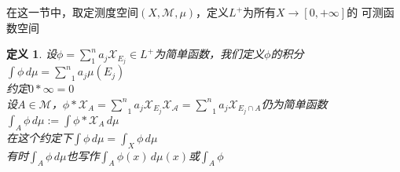 \documentclass[12pt, a4paper, oneside]{ctexbook}
\newtheorem{definition}[theorem]{定义}
\begin{document}
在这一节中，取定测度空间$(X,\mathcal{M},\mu)$，定义$L^+$为所有$X\to[0,+\infty]$的
可测函数空间
\begin{definition}
    设$\phi=\sum_1^na_j\mathcal{X}_{E_j}\in L^+$为简单函数，我们定义$\phi$的积分\\
    $\int\phi\,d\mu=\underset{1}{\overset{n}{\sum}}a_j\mu(E_j)$\\
    约定$0*\infty=0$\\
    设$A\in\mathcal{M}$，$\phi*\mathcal{X}_A=\underset{1}{\overset{n}{\sum}}a_j\mathcal{X}_{E_j}\mathcal{X_A}=\underset{1}{\overset{n}{\sum}}a_j\mathcal{X}_{E_j\cap A}$仍为简单函数\\
    $\int_{A}\phi\,d\mu:=\int\phi*\mathcal{X}_A\,d\mu$\\
    在这个约定下$\int\phi\,d\mu=\int_X\phi\,d\mu$\\
    有时$\int_A\phi\,d\mu$也写作$\int_A\phi(x)\,d\mu(x)$或$\int_A\phi$
\end{definition}
\end{document}
